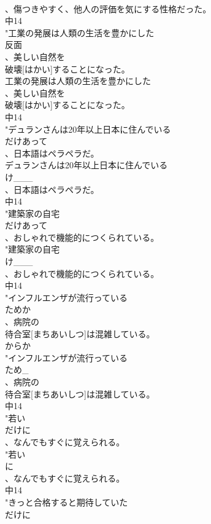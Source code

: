 \documentclass[8pt]{extreport}
\begin{document}
\begin{CJK}{UTF8}{min}
\\	、傷つきやすく、他人の評価を気にする性格だった。
\\	中14
\\	"工業の発展は人類の生活を豊かにした
\\	反面
\\	、美しい自然を
\\	破壊[はかい]することになった。
\\	工業の発展は人類の生活を豊かにした
\\	、美しい自然を
\\	破壊[はかい]することになった。
\\	中14
\\	"デュランさんは20年以上日本に住んでいる
\\	だけあって
\\	、日本語はペラペラだ。
\\	デュランさんは20年以上日本に住んでいる
\\	け___
\\	、日本語はペラペラだ。
\\	中14
\\	"建築家の自宅
\\	だけあって
\\	、おしゃれで機能的につくられている。
\\	"建築家の自宅
\\	け___
\\	、おしゃれで機能的につくられている。
\\	中14
\\	"インフルエンザが流行っている
\\	ためか
\\	、病院の
\\	待合室[まちあいしつ]は混雑している。
\\	からか
\\	"インフルエンザが流行っている
\\	ため_
\\	、病院の
\\	待合室[まちあいしつ]は混雑している。
\\	中14
\\	"若い
\\	だけに
\\	、なんでもすぐに覚えられる。
\\	"若い
\\	に
\\	、なんでもすぐに覚えられる。
\\	中14
\\	"きっと合格すると期待していた
\\	だけに

\end{CJK}
\end{document}
